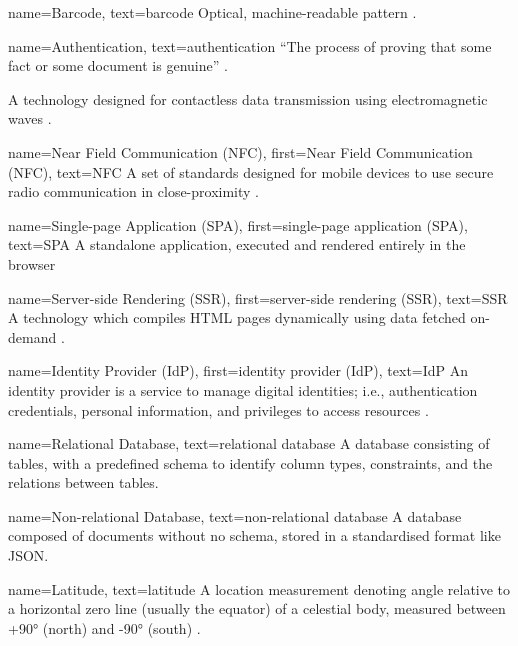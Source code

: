 {
  name={Barcode},
  text={barcode}
}
{
  Optical, machine-readable pattern
  \parencite{whatIsABarcode}.
}

{
  name={Authentication},
  text={authentication}
}
{
  \enquote{The process of proving that some fact or some
    document is genuine} \parencite{whatIsAuth}.
}

{
  A technology designed for contactless data transmission
  using electromagnetic waves \parencite{whatIsRfid}.
}

{
  name={Near Field Communication (NFC)},
  first={Near Field Communication (NFC)},
  text={NFC}
}
{
  A set of standards designed for mobile devices to use
  secure radio communication in close-proximity \cite{nfc}.
}

{
  name={Single-page Application (SPA)},
  first={single-page application (SPA)},
  text={SPA}
}
{
  A standalone application, executed and rendered entirely
  in the browser \parencite{webTechComparison}
}

{
  name={Server-side Rendering (SSR)},
  first={server-side rendering (SSR)},
  text={SSR}
}
{
  A technology which compiles HTML pages dynamically using
  data fetched on-demand \parencite{webTechComparison}.
}

{
  name={Identity Provider (IdP)},
  first={identity provider (IdP)},
  text={IdP}
}
{
  An identity provider is a service to manage digital
  identities; i.e., authentication credentials, personal
  information, and privileges to access resources
  \parencite{identityProviders}.
}

{
  name={Relational Database},
  text={relational database}
}
{
  A database consisting of tables, with a predefined schema
  to identify column types, constraints, and the relations
  between tables.
}

{
  name={Non-relational Database},
  text={non-relational database}
}
{
  A database composed of documents without no schema,
  stored in a standardised format like JSON.
}

{
  name={Latitude},
  text={latitude}
}
{
  A location measurement denoting angle relative to a
  horizontal zero line (usually the equator) of a celestial
  body, measured between +\ang{90} (north) and -\ang{90}
  (south) \parencite{coordSystems}.
}

